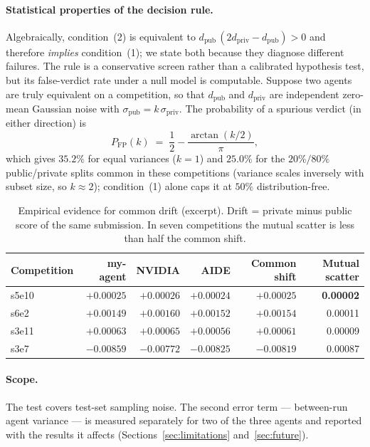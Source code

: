 \documentclass[11pt,a4paper]{article}
\begin{document}
\paragraph{Statistical properties of the decision rule.} Algebraically, condition~(2) is equivalent to $d_{\mathrm{pub}}\,(2d_{\mathrm{priv}} - d_{\mathrm{pub}}) > 0$ and therefore \emph{implies} condition~(1); we state both because they diagnose different failures. The rule is a conservative screen rather than a calibrated hypothesis test, but its false-verdict rate under a null model is computable. Suppose two agents are truly equivalent on a competition, so that $d_{\mathrm{pub}}$ and $d_{\mathrm{priv}}$ are independent zero-mean Gaussian noise with $\sigma_{\mathrm{pub}} = k\,\sigma_{\mathrm{priv}}$. The probability of a spurious verdict (in either direction) is
\begin{equation}
P_{\mathrm{FP}}(k) \;=\; \frac{1}{2} - \frac{\arctan(k/2)}{\pi},
\end{equation}
which gives $35.2\%$ for equal variances ($k=1$) and $25.0\%$ for the $20\%/80\%$ public/private splits common in these competitions (variance scales inversely with subset size, so $k \approx 2$); condition~(1) alone caps it at $50\%$ distribution-free.

\begin{table}[htbp]
\centering\small
\caption{Empirical evidence for common drift (excerpt). Drift = private minus public score of the same submission. In seven competitions the mutual scatter is less than half the common shift.}
\label{tab:drift}
\begin{tabular}{@{}lrrrrr@{}}
\toprule
\textbf{Competition} & \textbf{my-agent} & \textbf{NVIDIA} & \textbf{AIDE} & \textbf{Common shift} & \textbf{Mutual scatter} \\
\midrule
s5e10 & $+0.00025$ & $+0.00026$ & $+0.00024$ & $+0.00025$ & \textbf{0.00002} \\
s6e2  & $+0.00149$ & $+0.00160$ & $+0.00152$ & $+0.00154$ & 0.00011 \\
s3e11 & $+0.00063$ & $+0.00065$ & $+0.00056$ & $+0.00061$ & 0.00009 \\
s3e7  & $-0.00859$ & $-0.00772$ & $-0.00825$ & $-0.00819$ & 0.00087 \\
\bottomrule
\end{tabular}
\end{table}

\paragraph{Scope.} The test covers test-set sampling noise. The second error term --- between-run agent variance --- is measured separately for two of the three agents and reported with the results it affects (Sections~\ref{sec:limitations} and~\ref{sec:future}).
\end{document}
